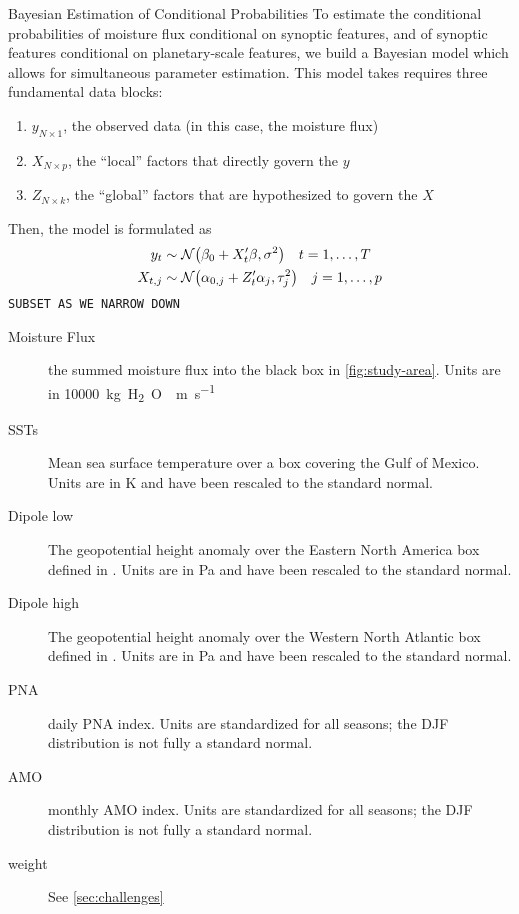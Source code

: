\begin{block}{Bayesian Estimation of Conditional Probabilities}
    To estimate the conditional probabilities of moisture flux conditional on synoptic features, and of synoptic features conditional on planetary-scale features, we build a Bayesian model which allows for simultaneous parameter estimation.
    This model takes requires three fundamental data blocks:
    \begin{enumerate}
        \item $y_{N \times 1}$, the observed data (in this case, the moisture flux)
        \item $X_{N \times p}$, the ``local'' factors that directly govern the $y$
        \item $Z_{N \times k}$, the ``global'' factors that are hypothesized to govern the $X$
    \end{enumerate}
    Then, the model is formulated as
    \begin{align}
        y_t & \sim \mathcal{N} \qty(\beta_0 + X'_t \beta, \sigma^2) \quad t = 1, \ldots, T \label{eq:yX}\\
        X_{t,j} &\sim \mathcal{N} \qty(\alpha_{0,j} + Z'_t \alpha_j, \tau_j^2) \quad j = 1, \ldots, p \label{eq:XZ}
    \end{align}
    \texttt{SUBSET AS WE NARROW DOWN}
    \begin{description}
        \item[Moisture Flux] the summed moisture flux into the black box in \cref{fig:study-area}. Units are in \SI{10000}{\kilo\gram H_2O \per\meter\per\second}
        \item[SSTs] Mean sea surface temperature over a box covering the Gulf of Mexico. Units are in \si{\kelvin} and have been rescaled to the standard normal.
        \item[Dipole low] The geopotential height anomaly over the Eastern North America box defined in \citet{Farnham2016}. Units are in \si{\pascal} and have been rescaled to the standard normal.
        \item[Dipole high] The geopotential height anomaly over the Western North Atlantic box defined in \citet{Farnham2016}. Units are in \si{\pascal} and have been rescaled to the standard normal.
        \item[PNA] daily PNA index. Units are standardized for all seasons; the DJF distribution is not fully a standard normal.
        \item[AMO] monthly AMO index. Units are standardized for all seasons; the DJF distribution is not fully a standard normal.
        \item[weight] See \cref{sec:challenges}
    \end{description}
\end{block}
